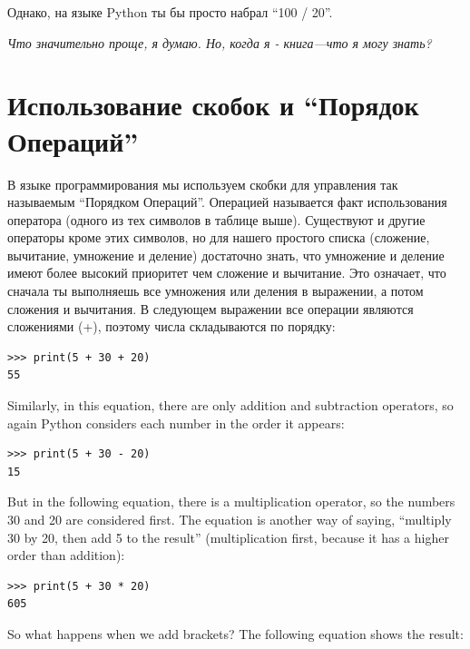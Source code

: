 Однако, на языке Python ты бы просто набрал ``100 / 20''.

\emph{Что значительно проще, я думаю.  Но, когда я - книга---что я могу знать?}

\section{Использование скобок и ``Порядок Операций''}

В языке программирования мы используем скобки для управления так называемым ``Порядком Операций''.  Операцией называется факт использования оператора (одного из тех символов в таблице выше). Существуют и другие операторы кроме этих символов, но для нашего простого списка (сложение, вычитание, умножение и деление) достаточно знать, что умножение и деление имеют более высокий приоритет чем сложение и вычитание.  Это означает, что сначала ты выполняешь все умножения или деления в выражении, а потом сложения и вычитания.  В следующем выражении все операции являются сложениями (+), поэтому числа складываются по порядку:

\begin{listing}
\begin{verbatim}
>>> print(5 + 30 + 20)
55
\end{verbatim}
\end{listing}

\noindent
Similarly, in this equation, there are only addition and subtraction operators, so again Python considers each number in the order it appears:

\begin{listing}
\begin{verbatim}
>>> print(5 + 30 - 20)
15
\end{verbatim}
\end{listing}

\noindent
But in the following equation, there is a multiplication operator, so the numbers 30 and 20 are considered first.  The equation is another way of saying, ``multiply 30 by 20, then add 5 to the result'' (multiplication first, because it has a higher order than addition):

\begin{listing}
\begin{verbatim}
>>> print(5 + 30 * 20)
605
\end{verbatim}
\end{listing}

\noindent
So what happens when we add brackets?  The following equation shows the result:

